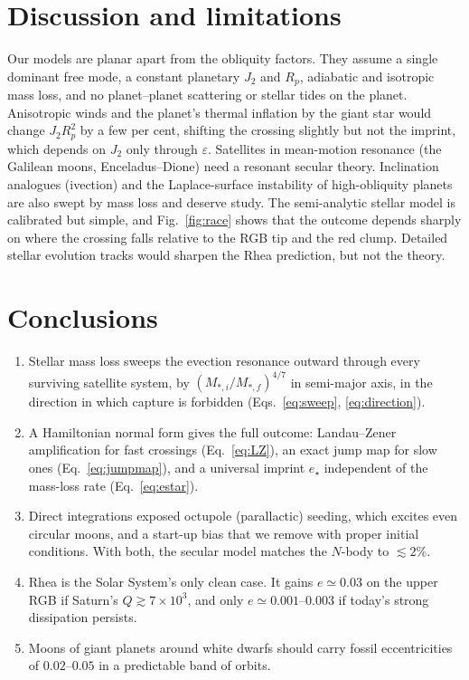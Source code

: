 \documentclass[11pt,a4paper]{article}
\newcommand{\estar}{e_\star}
\newcommand{\eps}{\varepsilon}
\begin{document}
\section{Discussion and limitations}

Our models are planar apart from the obliquity factors. They assume a single dominant free mode, a constant planetary $J_2$ and $R_p$, adiabatic and isotropic mass loss, and no planet--planet scattering or stellar tides on the planet. Anisotropic winds and the planet's thermal inflation by the giant star would change $J_2R_p^2$ by a few per cent, shifting the crossing slightly but not the imprint, which depends on $J_2$ only through $\eps$. Satellites in mean-motion resonance (the Galilean moons, Enceladus--Dione) need a resonant secular theory. Inclination analogues (ivection) and the Laplace-surface instability of high-obliquity planets \citep{Tremaine2009} are also swept by mass loss and deserve study. The semi-analytic stellar model is calibrated but simple, and Fig.~\ref{fig:race} shows that the outcome depends sharply on where the crossing falls relative to the RGB tip and the red clump. Detailed stellar evolution tracks would sharpen the Rhea prediction, but not the theory.

\section{Conclusions}

\begin{enumerate}
\item Stellar mass loss sweeps the evection resonance outward through every surviving satellite system, by $(M_{\ast,i}/M_{\ast,f})^{4/7}$ in semi-major axis, in the direction in which capture is forbidden (Eqs.~\ref{eq:sweep}, \ref{eq:direction}).
\item A Hamiltonian normal form gives the full outcome: Landau--Zener amplification for fast crossings (Eq.~\ref{eq:LZ}), an exact jump map for slow ones (Eq.~\ref{eq:jumpmap}), and a universal imprint $\estar$ independent of the mass-loss rate (Eq.~\ref{eq:estar}).
\item Direct integrations exposed octupole (parallactic) seeding, which excites even circular moons, and a start-up bias that we remove with proper initial conditions. With both, the secular model matches the $N$-body to $\lesssim2\%$.
\item Rhea is the Solar System's only clean case. It gains $e\simeq0.03$ on the upper RGB if Saturn's $Q\gtrsim7\times10^3$, and only $e\simeq0.001$--$0.003$ if today's strong dissipation persists.
\item Moons of giant planets around white dwarfs should carry fossil eccentricities of $0.02$--$0.05$ in a predictable band of orbits.
\end{enumerate}
\end{document}
